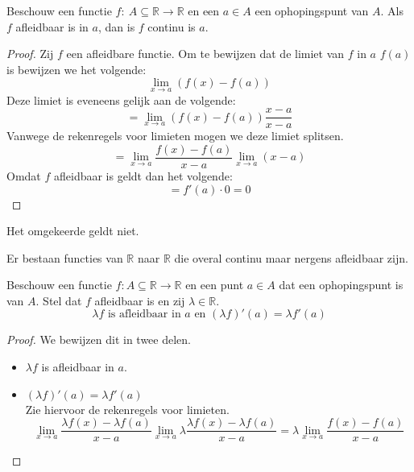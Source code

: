 \documentclass[main.tex]{subfiles}
\begin{document}
\begin{pr}
  \label{pr:afleidbaar-dan-continu}
  Beschouw een functie $f:\ A \subseteq \mathbb{R} \rightarrow \mathbb{R}$ en een $a\in A$ een ophopingspunt van $A$.
  Als $f$ afleidbaar is in $a$, dan is $f$ continu is $a$.

  \begin{proof}
    Zij $f$ een afleidbare functie.
    Om te bewijzen dat de limiet van $f$ in $a$ $f(a)$ is bewijzen we het volgende:
    \[ \lim_{x \rightarrow a}\left(f(x)-f(a)\right)\]
    Deze limiet is eveneens gelijk aan de volgende:
    \[ = \lim_{x \rightarrow a}\left(f(x)-f(a)\right)\frac{x-a}{x-a} \]
    Vanwege de rekenregels voor limieten mogen we deze limiet splitsen.
    \[ = \lim_{x \rightarrow a}\frac{f(x)-f(a)}{x-a}\lim_{x \rightarrow a}(x-a) \]
    Omdat $f$ afleidbaar is geldt dan het volgende:
    \[ = f'(a)\cdot 0 = 0 \]
  \end{proof}
\end{pr}

\begin{tvb}
  Het omgekeerde geldt niet.
\end{tvb}

\begin{st}
  Er bestaan functies van $\mathbb{R}$ naar $\mathbb{R}$ die overal continu maar nergens afleidbaar zijn.
\end{st}

\begin{pr}
  Beschouw een functie $f: A \subseteq \mathbb{R} \rightarrow \mathbb{R}$ en een punt $a\in A$ dat een ophopingspunt is van $A$.
  Stel dat $f$ afleidbaar is en zij $\lambda \in \mathbb{R}$.
  \[ \lambda f \text{ is afleidbaar in } a \text{ en } (\lambda f)'(a) = \lambda f'(a) \]

  \begin{proof}
    We bewijzen dit in twee delen.
    \begin{itemize}
    \item $\lambda f$ is afleidbaar in $a$.
    \item $(\lambda f)'(a) = \lambda f'(a)$\\
      Zie hiervoor de rekenregels voor limieten.
      \[ \lim_{x \rightarrow a}\frac{\lambda f(x)-\lambda f(a)}{x-a} \lim_{x \rightarrow a}\lambda \frac{\lambda f(x)-\lambda f(a)}{x-a} = \lambda \lim_{x \rightarrow a}\frac{f(x)-f(a)}{x-a} \]
    \end{itemize}
  \end{proof}
\end{pr}
\end{document}
